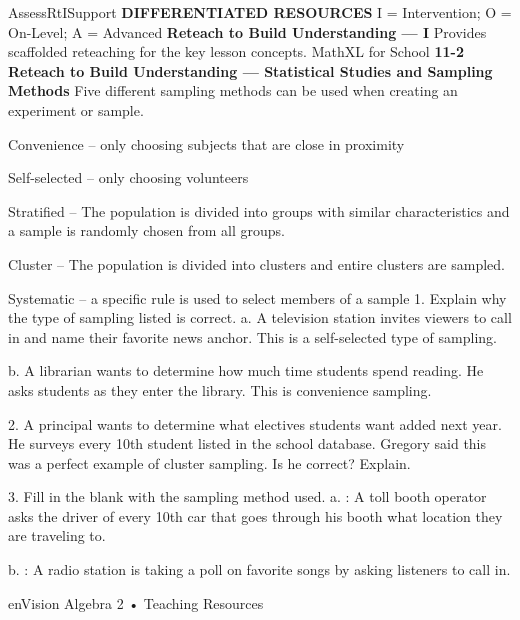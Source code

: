 \documentclass{article}
\newenvironment{te-addendum}[2]{}{}     %
\newcommand{\answer}[1]{}               %
\begin{document}
\begin{te-addendum}{Assess}{RtISupport}
\textbf{DIFFERENTIATED RESOURCES} I = Intervention; O = On-Level; A = Advanced
\textbf{Reteach to Build Understanding — I}
Provides scaffolded reteaching for the key lesson concepts.
MathXL for School
\textbf{11-2 Reteach to Build Understanding — Statistical Studies and Sampling Methods}
Five different sampling methods can be used when creating an experiment or sample.
\item Convenience – only choosing subjects that are close in proximity
\item Self-selected – only choosing volunteers
\item Stratified – The population is divided into groups with similar characteristics and a sample is randomly chosen from all groups.
\item Cluster – The population is divided into clusters and entire clusters are sampled.
\item Systematic – a specific rule is used to select members of a sample
1. Explain why the type of sampling listed is correct.
a. A television station invites viewers to call in and name their favorite news anchor. This is a self-selected type of sampling.
\answer{The viewers are self-selected because they volunteered to call in.}
b. A librarian wants to determine how much time students spend reading. He asks students as they enter the library. This is convenience sampling.
\answer{It is convenient to the librarian to select only the students entering the library.}
2. A principal wants to determine what electives students want added next year. He surveys every 10th student listed in the school database. Gregory said this was a perfect example of cluster sampling. Is he correct? Explain.
\answer{Gregory is incorrect. The principal is using systematic sampling because the principal uses a rule when determining which students he asks.}
3. Fill in the blank with the sampling method used.
a. \underline{\hspace{1cm}}: A toll booth operator asks the driver of every 10th car that goes through his booth what location they are traveling to.
\answer{systematic sampling}
b. \underline{\hspace{1cm}}: A radio station is taking a poll on favorite songs by asking listeners to call in.
\answer{self-selected sampling}
enVision Algebra 2 • Teaching Resources
\end{te-addendum}
\end{document}
